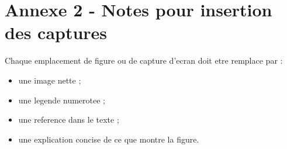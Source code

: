 \documentclass[12pt,a4paper,oneside]{report}
\begin{document}
\section*{Annexe 2 - Notes pour insertion des captures}
Chaque emplacement de figure ou de capture d'ecran doit etre remplace par :
\begin{itemize}
\item une image nette ;
\item une legende numerotee ;
\item une reference dans le texte ;
\item une explication concise de ce que montre la figure.
\end{itemize}
\end{document}

